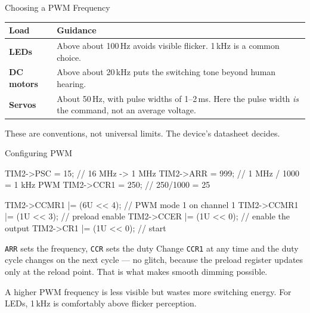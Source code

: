 \documentclass[9pt,aspectratio=169,xcolor=table]{beamer}
\begin{document}
\begin{frame}{Choosing a PWM Frequency}
    \begin{center}
    {\small
    \striped
    \begin{tabular}{@{}l R{.62\textwidth}@{}}
        \toprule
        \textbf{Load} & \textbf{Guidance} \\
        \midrule
        \textbf{LEDs} & Above about 100\,Hz avoids visible flicker. 1\,kHz is a common choice. \\
        \textbf{DC motors} & Above about 20\,kHz puts the switching tone beyond human hearing. \\
        \textbf{Servos} & About 50\,Hz, with pulse widths of 1--2\,ms. Here the pulse width \emph{is} the command, not an average voltage. \\
        \bottomrule
    \end{tabular}}
    \end{center}

    \vspace{3mm}
    {\small These are conventions, not universal limits. \alert{The device's datasheet decides.}}
\end{frame}

\begin{frame}[fragile]{Configuring PWM}

\begin{cc}[basicstyle=\ttfamily\small]
TIM2->PSC  = 15;                 // 16 MHz -> 1 MHz
TIM2->ARR  = 999;                // 1 MHz / 1000 = 1 kHz PWM
TIM2->CCR1 = 250;                // 250/1000 = 25%

TIM2->CCMR1 |= (6U << 4);        // PWM mode 1 on channel 1
TIM2->CCMR1 |= (1U << 3);        // preload enable
TIM2->CCER  |= (1U << 0);        // enable the output
TIM2->CR1   |= (1U << 0);        // start
\end{cc}

    \vspace{2mm}
    \begin{block}{\texttt{ARR} sets the frequency, \texttt{CCR} sets the duty}
        Change \texttt{CCR1} at any time and the duty cycle changes on the next
        cycle --- no glitch, because the preload register updates only at the
        reload point. \alert{That is what makes smooth dimming possible.}
    \end{block}

    \vspace{1mm}
    {\small A higher PWM frequency is less visible but wastes more switching
    energy. For LEDs, 1\,kHz is comfortably above flicker perception.}
\end{frame}
\end{document}
